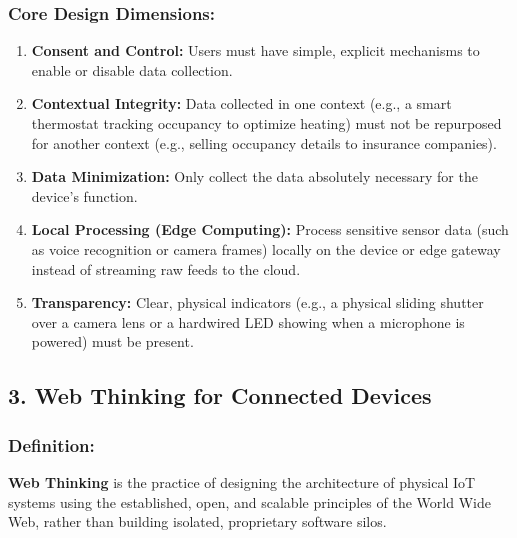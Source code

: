 \subsubsection{Core Design Dimensions:}
\begin{enumerate}
  \item \textbf{Consent and Control:} Users must have simple, explicit mechanisms to enable or disable data collection.
  \item \textbf{Contextual Integrity:} Data collected in one context (e.g., a smart thermostat tracking occupancy to optimize heating) must not be repurposed for another context (e.g., selling occupancy details to insurance companies).
  \item \textbf{Data Minimization:} Only collect the data absolutely necessary for the device's function.
  \item \textbf{Local Processing (Edge Computing):} Process sensitive sensor data (such as voice recognition or camera frames) locally on the device or edge gateway instead of streaming raw feeds to the cloud.
  \item \textbf{Transparency:} Clear, physical indicators (e.g., a physical sliding shutter over a camera lens or a hardwired LED showing when a microphone is powered) must be present.
\end{enumerate}


\subsection{3. Web Thinking for Connected Devices}

\subsubsection{Definition:}
\textbf{Web Thinking} is the practice of designing the architecture of physical IoT systems using the established, open, and scalable principles of the World Wide Web, rather than building isolated, proprietary software silos.

